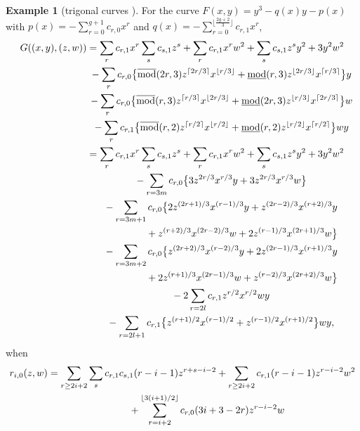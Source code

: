 \documentclass[pdftex]{sigma}
\numberwithin{equation}{section}
\theoremstyle{definition}
\newtheorem{rei}[teiri]{Example}
\begin{document}
\begin{rei}[trigonal curves \cite{DD,GG}]
For the curve $F(x,y)=y^3-q(x)y-p(x)$ with $p(x)=-\sum\limits_{r=0}^{g+1}c_{r,0}x^r$ and $q(x)=-\sum\limits_{r=0}^{\lfloor\frac{2g+2}{3}\rfloor}c_{r,1}x^r$,
\begin{gather*}
 G((x,y),(z,w)) =\sum_r c_{r,1}x^r\sum_sc_{s,1}z^s+\sum_rc_{r,1}x^rw^2+\sum_sc_{s,1}z^sy^2+3y^2w^2\\
 \hphantom{G((x,y),(z,w)) =}{} -\sum_rc_{r,0}\big\{\overline{\rm mod}(2r,3)z^{\lceil 2r/3\rceil}x^{\lfloor r/3\rfloor}+
\underline{\rm mod}(r,3)z^{\lfloor 2r/3\rfloor}x^{\lceil r/3\rceil}\big\}y\\
\hphantom{G((x,y),(z,w)) =}{}
-\sum_rc_{r,0}\big\{\overline{\rm mod}(r,3)z^{\lceil r/3\rceil}x^{\lfloor 2r/3\rfloor}+ \underline{\rm mod}(2r,3)z^{\lfloor r/3\rfloor}x^{\lceil 2r/3\rceil}
\big\}w\\
\hphantom{G((x,y),(z,w)) =}{}
 -\sum_rc_{r,1}\big\{\overline{\rm mod}(r,2)z^{\lceil r/2\rceil}x^{\lfloor r/2\rfloor}+
\underline{\rm mod}(r,2)z^{\lfloor r/2\rfloor}x^{\lceil r/2\rceil}\big\}wy\\
\hphantom{G((x,y),(z,w))}{}
 = \sum_r c_{r,1}x^r\sum_sc_{s,1}z^s+\sum_rc_{r,1}x^rw^2+\sum_sc_{s,1}z^sy^2+3y^2w^2\\
\hphantom{G((x,y),(z,w)) =}{}
-\sum_{r=3m}c_{r,0}\big\{3z^{2r/3}x^{r/3}y+3z^{2r/3}x^{r/3}w\big\}\\
\hphantom{G((x,y),(z,w)) =}{}
-\sum_{r=3m+1}c_{r,0}\big\{2z^{(2r+1)/3}x^{(r-1)/3}y+z^{(2r-2)/3}x^{(r+2)/3}y\\
\hphantom{G((x,y),(z,w)) =-\sum_{r=3m+1}}{}
+z^{(r+2)/3}x^{(2r-2)/3}w+2z^{(r-1)/3}x^{(2r+1)/3}w\big\}\\
\hphantom{G((x,y),(z,w)) =}{}
 -\sum_{r=3m+2}c_{r,0}\big\{z^{(2r+2)/3}x^{(r-2)/3}y+2z^{(2r-1)/3}x^{(r+1)/3}y\\
\hphantom{G((x,y),(z,w)) =-\sum_{r=3m+2}}{}
+2z^{(r+1)/3}x^{(2r-1)/3}w+z^{(r-2)/3}x^{(2r+2)/3}w\big\}\\
\hphantom{G((x,y),(z,w)) =}{}
 -2\sum_{r=2l}c_{r,1}z^{r/2}x^{r/2}wy\\
\hphantom{G((x,y),(z,w)) =}{}
 -\sum_{r=2l+1}c_{r,1}\big\{z^{(r+1)/2}x^{(r-1)/2}+z^{(r-1)/2}x^{(r+1)/2}\big\}wy,
\end{gather*}
when
\begin{gather*}
r_{i,0}(z,w) = \sum_{r\geq 2i+2}\sum_s c_{r,1}c_{s,1}(r-i-1)z^{r+s-i-2} +\sum_{r\geq 2i+2}c_{r,1}(r-i-1)z^{r-i-2}w^2\\
\hphantom{r_{i,0}(z,w) =}{} +\sum_{r=i+2}^{\lfloor 3(i+1)/2\rfloor}c_{r,0}(3i+3-2r)z^{r-i-2}w

\end{gather*}
\end{rei}
\end{document}
